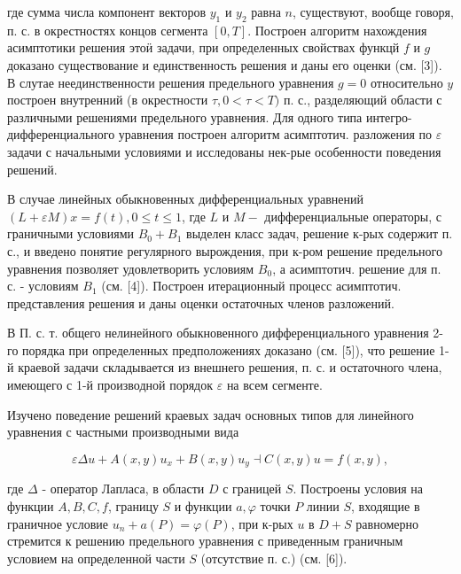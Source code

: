 \documentclass[10pt]{article}
\begin{document}
где сумма числа компонент векторов $y_{1}$ и $y_{2}$ равна $n$, существуют, вообще говоря, п. с. в окрестностях концов сегмента $[0, T]$. Построен алгоритм нахождения асимптотики решения этоӥ задачи, при определенных свойствах функцй $f$ и $g$ доказано существование и единственность решения и даны его оценки (см. [3]). В слутае неединственности решения предельного уравнения $g=0$ относительно $y$ построен внутренний (в окрестности $\tau, 0<\tau<T)$ п. с., разделяющий области с различными решениями предельного уравнения. Для одного типа интегро-дифференциального уравнения построен алгоритм асимптотич. разложения по $\varepsilon$ задачи с начальными условиями и исследованы нек-рые особенности поведения решений.



В случае линейных обыкновенных дифференциальных уравнений $(L+\varepsilon M) x=f(t), 0 \leqslant t \leqslant 1$, где $L$ и $M-$ дифференциальные операторы, с граничными условиями $B_{0}+B_{1}$ выделен класс задач, решение к-рых содержит п. с., и введено понятие регулярного вырождения, при к-ром решение предельного уравнения позволяет удовлетворить условиям $B_{0}$, а асимптотич. решение для п. с. - условиям $B_{1}$ (см. [4]). Построен итерационный процесс асимптотич. представления решения и даны оценки остаточных членов разложений.



В П. с. т. общего нелинейного обыкновенного дифференциального уравнения 2-го порядка при определенных предположениях доказано (см. [5]), что решение 1-й краевой задачи складывается из внешнего решения, п. с. и остаточного члена, имеющего с 1-й производной порядок $\varepsilon$ на всем сегменте.



Изучено поведение решений краевых задач основных типов для линейного уравнения с частными производными вида



\[

\varepsilon \Delta u+A(x, y) u_{x}+B(x, y) u_{y} \dashv C(x, y) u=f(x, y),

\]



где $\Delta$ - оператор Лапласа, в области $D$ с границей $S$. Построены условия на функции $A, B, C, f$, границу $S$ и функции $a, \varphi$ точки $P$ линии $S$, входящие в граничное условие $u_{n}+a(P)=\varphi(P)$, при к-рых $u$ в $D+S$ равномерно стремится к решению предельного уравнения с приведенным граничным условием на определенной части $S$ (отсутствие п. с.) (см. [6]).
\end{document}

